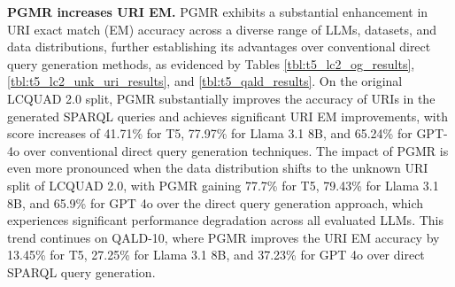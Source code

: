 

\noindent \textbf{PGMR increases URI EM.}
PGMR exhibits a substantial enhancement in URI exact match (EM) accuracy across a diverse range of LLMs, datasets, and data distributions, further establishing its advantages over conventional direct query generation methods, as evidenced by Tables \ref{tbl:t5_lc2_og_results}, \ref{tbl:t5_lc2_unk_uri_results}, and \ref{tbl:t5_qald_results}.
On the original LCQUAD 2.0 split, PGMR substantially improves the accuracy of URIs in the generated SPARQL queries and achieves significant URI EM improvements, with score increases of 41.71\% for T5, 77.97\% for Llama 3.1 8B, and 65.24\% for GPT-4o over conventional direct query generation techniques.
The impact of PGMR is even more pronounced when the data distribution shifts to the unknown URI split of LCQUAD 2.0, with PGMR gaining 77.7\% for T5, 79.43\% for Llama 3.1 8B, and 65.9\% for GPT 4o over the direct query generation approach, which experiences significant performance degradation across all evaluated LLMs.
This trend continues on QALD-10, where PGMR improves the URI EM accuracy by 13.45\% for T5, 27.25\% for Llama 3.1 8B, and 37.23\% for GPT 4o over direct SPARQL query generation.






